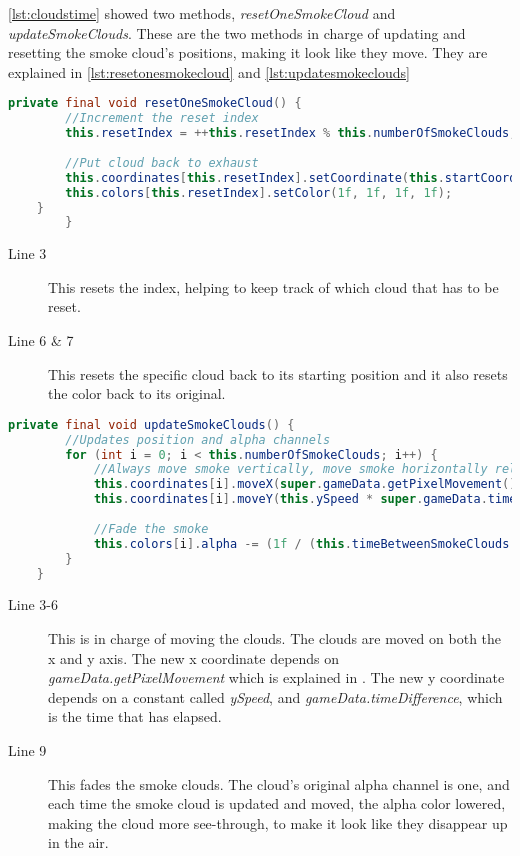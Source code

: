 \autoref{lst:cloudstime} showed two methods, \textit{resetOneSmokeCloud} and \textit{updateSmokeClouds}. These are the two methods in charge of updating and resetting the smoke cloud's positions, making it look like they move. They are explained in \autoref{lst:resetonesmokecloud} and \autoref{lst:updatesmokeclouds}

\begin{lstlisting}[language=java,firstnumber=1,caption={Smoke clouds getting reset based on time intervals},label=lst:resetonesmokecloud]
    private final void resetOneSmokeCloud() {
        //Increment the reset index
        this.resetIndex = ++this.resetIndex % this.numberOfSmokeClouds;
        
        //Put cloud back to exhaust
        this.coordinates[this.resetIndex].setCoordinate(this.startCoordinate.getX(), this.startCoordinate.getY());
        this.colors[this.resetIndex].setColor(1f, 1f, 1f, 1f);
    }
        }
\end{lstlisting}

\begin{description}
\item[Line 3] This resets the index, helping to keep track of which cloud that has to be reset. 
\item[Line 6 \& 7] This resets the specific cloud back to its starting position and it also resets the color back to its original. 
\end{description}
 
\begin{lstlisting}[language=java,firstnumber=1,caption={Smoke clouds getting reset based on time intervals},label=lst:updatesmokeclouds]
    private final void updateSmokeClouds() {
        //Updates position and alpha channels
        for (int i = 0; i < this.numberOfSmokeClouds; i++) {
            //Always move smoke vertically, move smoke horizontally relative to the train speed.
            this.coordinates[i].moveX(super.gameData.getPixelMovement());
            this.coordinates[i].moveY(this.ySpeed * super.gameData.timeDifference);
            
            //Fade the smoke
            this.colors[i].alpha -= (1f / (this.timeBetweenSmokeClouds * this.numberOfSmokeClouds)) * super.gameData.timeDifference;
        }
    }
\end{lstlisting}

\begin{description}
\item[Line 3-6] This is in charge of moving the clouds. The clouds are moved on both the x and y axis. The new x coordinate depends on \textit{gameData.getPixelMovement} which is explained in . The new y coordinate depends on a constant called \textit{ySpeed}, and \textit{gameData.timeDifference}, which is the time that has elapsed.
\item[Line 9] This fades the smoke clouds. The cloud's original alpha channel is one, and each time the smoke cloud is updated and moved, the alpha color lowered, making the cloud more see-through, to make it look like they disappear up in the air. 
\end{description}

